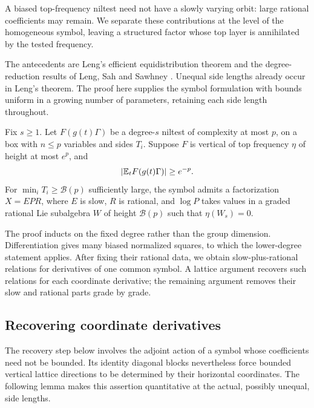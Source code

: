 A biased top-frequency niltest need not have a slowly varying orbit:
large rational coefficients may remain. We separate these contributions
at the level of the homogeneous symbol, leaving a structured factor
whose top layer is annihilated by the tested frequency.

The antecedents are Leng's efficient equidistribution theorem
\cite[Theorem~4]{LengEquidistribution2023} and the degree-reduction
results of Leng, Sah and Sawhney
\cite[Theorem~5.4 and Corollary~5.5]{LSSInverse2024}. Unequal side
lengths already occur in Leng's theorem. The proof here supplies the
symbol formulation with bounds uniform in a growing number of
parameters, retaining each side length throughout.

\begin{lemma}\label{prelim:step-drop}
Fix $s\geq1$.  Let $F(g(t)\Gamma)$ be a degree-$s$ niltest of
complexity at most $p$, on a box with $n\leq p$ variables and sides
$T_i$.  Suppose $F$ is vertical of top frequency $\eta$ of height
at most $e^p$, and
\[
 \left|\mathbb E_tF(g(t)\Gamma)\right|\geq e^{-p}.
\]
For $\min_iT_i\geq\mathcal B(p)$ sufficiently large, the symbol
admits a factorization $X=EPR$, where $E$ is slow, $R$ is rational,
and $\log P$ takes values in a graded rational Lie subalgebra $W$
of height $\mathcal B(p)$ such that $\eta(W_s)=0$.
\end{lemma}

The proof inducts on the fixed degree rather than the group dimension.
Differentiation gives many biased normalized squares, to which the
lower-degree statement applies. After fixing their rational data, we
obtain slow-plus-rational relations for derivatives of one common
symbol. A lattice argument recovers such relations for each coordinate
derivative; the remaining argument removes their slow and rational
parts grade by grade.

\subsection{Recovering coordinate derivatives}

The recovery step below involves the adjoint action of a symbol whose
coefficients need not be bounded. Its identity diagonal blocks nevertheless
force bounded vertical lattice directions to be determined by their
horizontal coordinates. The following lemma makes this assertion
quantitative at the actual, possibly unequal, side lengths.

